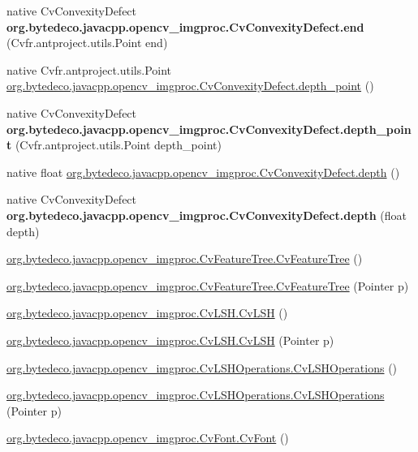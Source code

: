 \begin{DoxyCompactItemize}
native Cv\+Convexity\+Defect {\bfseries org.\+bytedeco.\+javacpp.\+opencv\+\_\+imgproc.\+Cv\+Convexity\+Defect.\+end} (Cv\+fr.antproject.utils.Point end)
\item 
native Cv\+fr.antproject.utils.Point \hyperlink{group__imgproc_ga7de5f58f386b3cf8bef96739d89a24cb}{org.\+bytedeco.\+javacpp.\+opencv\+\_\+imgproc.\+Cv\+Convexity\+Defect.\+depth\+\_\+point} ()
\item 
\mbox{\label{group__imgproc_ga633bdf0f4c3d06acebdf7b2da8cff4a0}} 
native Cv\+Convexity\+Defect {\bfseries org.\+bytedeco.\+javacpp.\+opencv\+\_\+imgproc.\+Cv\+Convexity\+Defect.\+depth\+\_\+point} (Cv\+fr.antproject.utils.Point depth\+\_\+point)
\item 
native float \hyperlink{group__imgproc_ga8baffaba023fa380d056b4686becfd86}{org.\+bytedeco.\+javacpp.\+opencv\+\_\+imgproc.\+Cv\+Convexity\+Defect.\+depth} ()
\item 
\mbox{\label{group__imgproc_gac265d8eb5b051226ff167fb9fd5efe61}} 
native Cv\+Convexity\+Defect {\bfseries org.\+bytedeco.\+javacpp.\+opencv\+\_\+imgproc.\+Cv\+Convexity\+Defect.\+depth} (float depth)
\item 
\hyperlink{group__imgproc_ga64f131e4a0b5b9bba476aeb72e312149}{org.\+bytedeco.\+javacpp.\+opencv\+\_\+imgproc.\+Cv\+Feature\+Tree.\+Cv\+Feature\+Tree} ()
\item 
\hyperlink{group__imgproc_gab59ec65713a2411ca46f665e7ed0ed65}{org.\+bytedeco.\+javacpp.\+opencv\+\_\+imgproc.\+Cv\+Feature\+Tree.\+Cv\+Feature\+Tree} (Pointer p)
\item 
\hyperlink{group__imgproc_gaaeb804ef7f6cb4b94f94461f5076c801}{org.\+bytedeco.\+javacpp.\+opencv\+\_\+imgproc.\+Cv\+L\+S\+H.\+Cv\+L\+SH} ()
\item 
\hyperlink{group__imgproc_gae5c4e2c53fa50e1dd7dd6aa81c31b5ee}{org.\+bytedeco.\+javacpp.\+opencv\+\_\+imgproc.\+Cv\+L\+S\+H.\+Cv\+L\+SH} (Pointer p)
\item 
\hyperlink{group__imgproc_gaabec493f329bf6b4f40358564e943ed6}{org.\+bytedeco.\+javacpp.\+opencv\+\_\+imgproc.\+Cv\+L\+S\+H\+Operations.\+Cv\+L\+S\+H\+Operations} ()
\item 
\hyperlink{group__imgproc_ga71648279df2a0c93cb7616055661e4e8}{org.\+bytedeco.\+javacpp.\+opencv\+\_\+imgproc.\+Cv\+L\+S\+H\+Operations.\+Cv\+L\+S\+H\+Operations} (Pointer p)
\item 
\hyperlink{group__imgproc_ga53abe9deb6276658b9dc59eed7558c14}{org.\+bytedeco.\+javacpp.\+opencv\+\_\+imgproc.\+Cv\+Font.\+Cv\+Font} ()

\end{DoxyCompactItemize}
